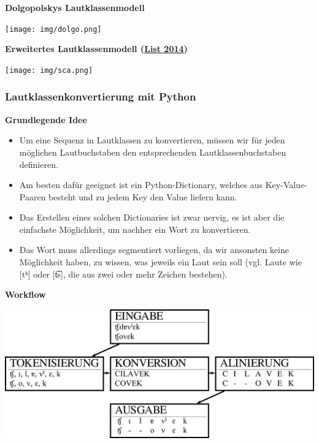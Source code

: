 \vspace{0.5cm}\par\noindent\textbf{Dolgopolskys Lautklassenmodell}\vspace{0.5cm}

\texttt{[image: img/dolgo.png]}



\vspace{0.5cm}\par\noindent\textbf{Erweitertes Lautklassenmodell\vspace{0.5cm}
(\href{http://bibliography.lingpy.org?key=List2014d}{List 2014})}

\texttt{[image: img/sca.png]}


\subsubsection{\texorpdfstring{{Lautklassenkonvertierung mit
Python}}{Lautklassenkonvertierung mit Python}}

\vspace{0.5cm}\par\noindent\textbf{Grundlegende Idee}\vspace{0.5cm}

\begin{itemize}
\itemsep1pt\parskip0pt
\item
  Um eine Sequenz in Lautklassen zu konvertieren, müssen wir für jeden
  möglichen Lautbuchstaben den entsprechenden Lautklassenbuchstaben
  definieren.
\item
  Am besten dafür geeignet ist ein Python-Dictionary, welches aus
  Key-Value-Paaren besteht und zu jedem Key den Value liefern kann.
\item
  Das Erstellen eines solchen Dictionaries ist zwar nervig, es ist aber
  die einfachste Möglichkeit, um nachher ein Wort zu konvertieren.
\item
  Das Wort muss allerdings segmentiert vorliegen, da wir ansonsten keine
  Möglichkeit haben, zu wissen, was jeweils ein Laut sein soll (vgl.
  Laute wie {[}tʰ{]} oder {[}t͡s{]}, die aus zwei oder mehr Zeichen
  bestehen).
\end{itemize}




\vspace{0.5cm}\par\noindent\textbf{Workflow}\vspace{0.5cm}

\includegraphics[width=\textwidth]{img/sca_workflow-4.png}


